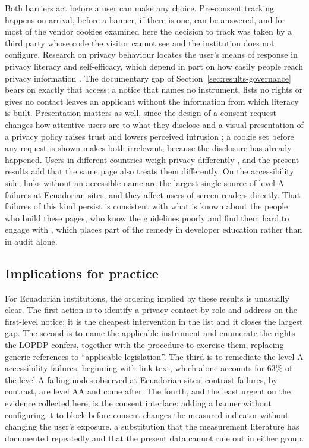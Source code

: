 \documentclass[]{interact}
\begin{document}
Both barriers act before a user can make any choice. Pre-consent tracking happens on arrival, before a banner, if there is one, can be answered, and for most of the vendor cookies examined here the decision to track was taken by a third party whose code the visitor cannot see and the institution does not configure. Research on privacy behaviour locates the user's means of response in privacy literacy and self-efficacy, which depend in part on how easily people reach privacy information \citep{meier2025differences,epstein2025dimensionalised}. The documentary gap of Section~\ref{sec:results-governance} bears on exactly that access: a notice that names no instrument, lists no rights or gives no contact leaves an applicant without the information from which literacy is built. Presentation matters as well, since the design of a consent request changes how attentive users are to what they disclose \citep{lindegren2021evaluation} and a visual presentation of a privacy policy raises trust and lowers perceived intrusion \citep{magrizos2026transparency}; a cookie set before any request is shown makes both irrelevant, because the disclosure has already happened. Users in different countries weigh privacy differently \citep{li2022cultural}, and the present results add that the same page also treats them differently. On the accessibility side, links without an accessible name are the largest single source of level-A failures at Ecuadorian sites, and they affect users of screen readers directly. That failures of this kind persist is consistent with what is known about the people who build these pages, who know the guidelines poorly and find them hard to engage with \citep{cao2022perceptions,spyridonis2021serious}, which places part of the remedy in developer education rather than in audit alone.

\subsection{Implications for practice}\label{sec:discussion-practice}

For Ecuadorian institutions, the ordering implied by these results is unusually clear. The first action is to identify a privacy contact by role and address on the first-level notice; it is the cheapest intervention in the list and it closes the largest gap. The second is to name the applicable instrument and enumerate the rights the LOPDP confers, together with the procedure to exercise them, replacing generic references to ``applicable legislation''. The third is to remediate the level-A accessibility failures, beginning with link text, which alone accounts for 63\% of the level-A failing nodes observed at Ecuadorian sites; contrast failures, by contrast, are level AA and come after. The fourth, and the least urgent on the evidence collected here, is the consent interface: adding a banner without configuring it to block before consent changes the measured indicator without changing the user's exposure, a substitution that the measurement literature has documented repeatedly \citep{sanchezrola2019can,bollinger2022automating} and that the present data cannot rule out in either group.
\end{document}
